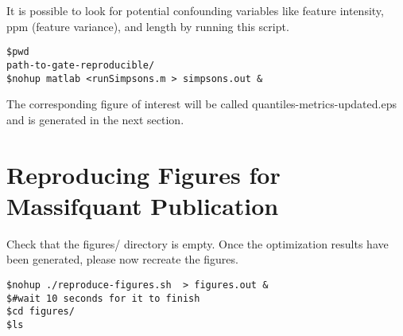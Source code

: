 \documentclass[11pt]{amsart}
\begin{document}
It is possible to look for potential confounding variables like feature intensity, ppm (feature variance), and length by running this script.

\begin{verbatim}
$pwd
path-to-gate-reproducible/
$nohup matlab <runSimpsons.m > simpsons.out &
\end{verbatim}

The corresponding figure of interest will be called quantiles-metrics-updated.eps and is generated in the next section.

\section{Reproducing Figures for Massifquant Publication}

Check that the figures/ directory is empty.
Once the optimization results have been generated, please now recreate the figures.
\begin{verbatim}
$nohup ./reproduce-figures.sh  > figures.out & 
$#wait 10 seconds for it to finish
$cd figures/
$ls
\end{verbatim}
\end{document}
